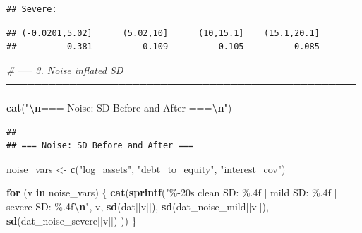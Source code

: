 \documentclass[
]{article}
\newenvironment{Shaded}{\begin{snugshade}}{\end{snugshade}}
\newcommand{\CommentTok}[1]{\textcolor[rgb]{0.56,0.35,0.01}{\textit{#1}}}
\newcommand{\ControlFlowTok}[1]{\textcolor[rgb]{0.13,0.29,0.53}{\textbf{#1}}}
\newcommand{\DecValTok}[1]{\textcolor[rgb]{0.00,0.00,0.81}{#1}}
\newcommand{\FunctionTok}[1]{\textcolor[rgb]{0.13,0.29,0.53}{\textbf{#1}}}
\newcommand{\NormalTok}[1]{#1}
\newcommand{\OtherTok}[1]{\textcolor[rgb]{0.56,0.35,0.01}{#1}}
\newcommand{\SpecialCharTok}[1]{\textcolor[rgb]{0.81,0.36,0.00}{\textbf{#1}}}
\newcommand{\StringTok}[1]{\textcolor[rgb]{0.31,0.60,0.02}{#1}}
\begin{document}
\begin{verbatim}
## Severe:
\end{verbatim}

\begin{Shaded}
\end{Shaded}

\begin{verbatim}
## (-0.0201,5.02]      (5.02,10]      (10,15.1]    (15.1,20.1] 
##          0.381          0.109          0.105          0.085
\end{verbatim}

\begin{Shaded}
\begin{Highlighting}[]
\CommentTok{\# ── 3. Noise inflated SD ──────────────────────────────────────────────────}

\FunctionTok{cat}\NormalTok{(}\StringTok{"}\SpecialCharTok{\textbackslash{}n}\StringTok{=== Noise: SD Before and After ===}\SpecialCharTok{\textbackslash{}n}\StringTok{"}\NormalTok{)}
\end{Highlighting}
\end{Shaded}

\begin{verbatim}
## 
## === Noise: SD Before and After ===
\end{verbatim}

\begin{Shaded}
\begin{Highlighting}[]
\NormalTok{noise\_vars }\OtherTok{\textless{}{-}} \FunctionTok{c}\NormalTok{(}\StringTok{"log\_assets"}\NormalTok{, }\StringTok{"debt\_to\_equity"}\NormalTok{, }\StringTok{"interest\_cov"}\NormalTok{)}

\ControlFlowTok{for}\NormalTok{ (v }\ControlFlowTok{in}\NormalTok{ noise\_vars) \{}
  \FunctionTok{cat}\NormalTok{(}\FunctionTok{sprintf}\NormalTok{(}\StringTok{"\%{-}20s clean SD: \%.4f | mild SD: \%.4f | severe SD: \%.4f}\SpecialCharTok{\textbackslash{}n}\StringTok{"}\NormalTok{,}
\NormalTok{    v,}
    \FunctionTok{sd}\NormalTok{(dat[[v]]),}
    \FunctionTok{sd}\NormalTok{(dat\_noise\_mild[[v]]),}
    \FunctionTok{sd}\NormalTok{(dat\_noise\_severe[[v]])}
\NormalTok{  ))}
\NormalTok{\}}
\end{Highlighting}
\end{Shaded}
\end{document}
